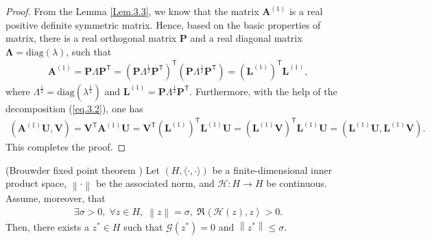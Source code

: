 \documentclass{siamart171218}
\numberwithin{theorem}{section}
\numberwithin{equation}{section}
\begin{document}
\begin{proof}
From the Lemma \ref{Lem.3.3}, we know that the matrix $\mathbf{A}^{(1)}$
is a real positive definite symmetric matrix.
Hence, based on the basic properties of matrix,
there is a real orthogonal matrix $\mathbf{P}$ and a real diagonal matrix
$\mathbf{\Lambda}=\mathrm{diag}\left(\lambda\right)$, such that
\begin{equation}\label{eq.3.2}
\begin{aligned}
{\mathbf{A}}^{(1)}=\mathbf{P}\Lambda\mathbf{P}^{\mathsf{T}}
=\left(\mathbf{P}\Lambda^{\frac{1}{2}}\mathbf{P}^{\mathsf{T}}\right)^{\mathsf{T}}
\left(\mathbf{P}\Lambda^{\frac{1}{2}}\mathbf{P}^{\mathsf{T}}\right)
=\left(\mathbf{L}^{(1)}\right)^{\mathsf{T}}\mathbf{L}^{(1)},
\end{aligned}
\end{equation}
where $\Lambda^{\frac{1}{2}}=\mathrm{diag}\left(\lambda^{\frac{1}{2}}\right)$
and $\mathbf{L}^{(1)}=\mathbf{P}\Lambda^{\frac{1}{2}}\mathbf{P}^{\mathsf{T}}$.
Furthermore, with the help of the decomposition (\ref{eq.3.2}), one has
\begin{equation*}
\begin{aligned}
\left({\mathbf{A}}^{(1)}\mathbf{U},\mathbf{V}\right)=
\mathbf{V}^{\mathsf{T}}{\mathbf{A}}^{(1)}\mathbf{U}
=\mathbf{V}^{\mathsf{T}}\left(\mathbf{L}^{(1)}\right)^{\mathsf{T}}
\mathbf{L}^{(1)}\mathbf{U}
=\left(\mathbf{L}^{(1)}\mathbf{V}\right)^{\mathsf{T}}
\mathbf{L}^{(1)}\mathbf{U}
=
\left({\mathbf{L}}^{(1)}
\mathbf{U},{\mathbf{L}}^{(1)}\mathbf{V}\right).
\end{aligned}
\end{equation*}
This completes the proof.
\end{proof}

\begin{lemma}\label{Lem.3.5}(Brouwder fixed point theorem \cite{Akrivis1993})
Let $\left(H,\langle\cdot,\cdot\rangle\right)$ be a finite-dimensional inner product space,
$\left\|\cdot\right\|$ be the associated norm, and $\mathcal{H}:H\rightarrow H$ be continuous.
 Assume, moreover, that
 \begin{equation*}
\begin{aligned}
\exists \sigma>0, \;\forall z\in H, \;\left\|z\right\|=\sigma,\;
\Re\left\langle \mathcal{H}(z),z\right\rangle>0.
\end{aligned}
\end{equation*}
Then, there exists a $z^*\in H$ such that $\mathcal{G}(z^*)=0$ and
 $\left\|z^*\right\|\leq\sigma$.
\end{lemma}
\end{document}
